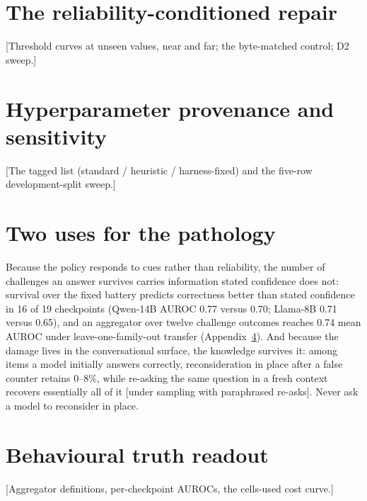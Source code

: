 \documentclass{article}
\newcommand{\pending}[1]{\textcolor{blue!70!black}{[#1]}}
\begin{document}
\section{The reliability-conditioned repair}\label{app:repair}
\pending{Threshold curves at unseen values, near and far; the byte-matched control; D2 sweep.}
\section{Hyperparameter provenance and sensitivity}\label{app:hparams}
\pending{The tagged list (standard / heuristic / harness-fixed) and the five-row development-split sweep.}
\section{Two uses for the pathology}\label{app:uses}
Because the policy responds to cues rather than reliability, the number of challenges an answer survives carries information stated confidence does not: survival over the fixed battery predicts correctness better than stated confidence in 16 of 19 checkpoints (Qwen-14B AUROC 0.77 versus 0.70; Llama-8B 0.71 versus 0.65), and an aggregator over twelve challenge outcomes reaches 0.74 mean AUROC under leave-one-family-out transfer (Appendix~\ref{app:readout}). And because the damage lives in the conversational surface, the knowledge survives it: among items a model initially answers correctly, reconsideration in place after a false counter retains 0--8\%, while re-asking the same question in a fresh context recovers essentially all of it \pending{under sampling with paraphrased re-asks}. Never ask a model to reconsider in place.

\section{Behavioural truth readout}\label{app:readout}
\pending{Aggregator definitions, per-checkpoint AUROCs, the cells-used cost curve.}
\end{document}
